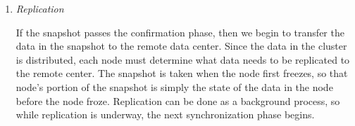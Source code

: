 \begin{enumerate}
\item \emph{Replication}
 
  If the snapshot passes the confirmation phase, then we begin to
  transfer the data in the snapshot to the remote data center. Since
  the data in the cluster is distributed, each node must determine
  what data needs to be replicated to the remote center. The snapshot
  is taken when the node first freezes, so that node's portion of the
  snapshot is simply the state of the data in the node before the node
  froze. Replication can be done as a background process, so while
  replication is underway, the next synchronization phase begins.

\end{enumerate}
